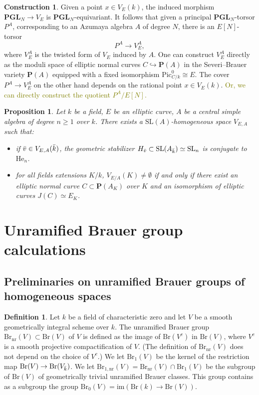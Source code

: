 \documentclass[10pt,letterpaper,twoside]{article}
\newcommand{\BA}[1]{\textcolor{olive}{#1}}
\renewcommand{\1}{\mathbf{1}}
\newcommand{\bP}{\mathbf{P}}
\newcommand{\nr}{\mathrm{nr}}
\newcommand{\im}{\mathrm{im}}
\renewcommand{\geq}{\geqslant}
\newcommand{\PGL}{\mathbf{PGL}}
\newcommand{\Pic}{\mathrm{Pic}}
\newcommand{\Br}{\mathrm{Br}}
\newcommand{\iso}{\cong}
\theoremstyle{plain}
\newtheorem{proposition}[theorem]{Proposition}
\theoremstyle{plain}
\theoremstyle{definition}
\theoremstyle{named}
\theoremstyle{definition}
\newtheorem{definition}[theorem]{Definition}
\newtheorem{construction}[theorem]{Construction}
\begin{document}
	\begin{construction}
		Given a point $x\in V_E(k)$, the induced morphism $\PGL_N\rightarrow V_E$ is
		$\PGL_N$-equivariant. It follows that given a principal $\PGL_N$-torsor $P^A$, corresponding to
		an Azumaya algebra $A$ of degree $N$, there is an $E[N]$-torsor $$P^A\rightarrow V_E^A,$$
		where $V_E^A$ is the twisted form of $V_E$ induced by $A$. One can construct $V_E^A$ directly as
		the moduli space of elliptic normal curves $C\hookrightarrow\bP(A)$ in the Severi--Brauer
		variety $\bP(A)$ equipped with a fixed isomorphism $\Pic^0_{C/k}\iso E$.
		The cover $P^A\rightarrow V_E^A$ on the other hand depends on the rational point $x\in V_E(k)$.
		\BA{Or, we can directly construct the quotient $P^A/E[N]$.}
	\end{construction}
	
	
	\begin{proposition}
		Let $k$ be a field, $E$ be an elliptic curve, $A$ be a central simple algebra of degree $n\geq 1$ over $k$. There exists a $\mathrm{SL}(A)$-homogeneous space $V_{E,A}$ such that:
		\begin{itemize}
			\item if $\Bar{v}\in V_{E,A}(\Bar{k})$, the geometric stabilizer $H_{\Bar{v}}\subset \mathrm{SL}(A_{\Bar{k}})\simeq \mathrm{SL}_n$ is conjugate to $\mathrm{He}_n$. 
			\item for all fields extensions $K/k$, $V_{E/A}(K)\neq\emptyset$ if and only if there exist an elliptic normal curve $C\subset \bP(A_K)$ over $K$ and an isomorphism of elliptic curves $J(C)\simeq E_K$.
		\end{itemize}
	\end{proposition}
	
	
	
	
	\section{Unramified Brauer group calculations}
	
	\subsection{Preliminaries on unramified Brauer groups of homogeneous spaces}
	
	\begin{definition}
		Let $k$ be a field of characteristic zero and let $V$ be a smooth geometrically integral scheme over $k$. The unramified Brauer group $\Br_{\nr}(V)\subset \Br(V)$ of $V$ is defined as the image of $\Br(V^c)$ in $\Br(V)$, where $V^c$ is a smooth projective compactification of $V$. (The definition of $\Br_{\nr}(V)$ does not depend on the choice of $V^c$.) We
		let $\Br_1(V)$ be the kernel of the restriction map $\Br(V)\to \Br(V_{\Bar{k}})$. We let $\Br_{1,\nr}(V)=\Br_\nr(V)\cap\Br_1(V)$ be the subgroup of $\Br(V)$ of geometrically trivial unramified Brauer classes. This group contains as a
		subgroup the group $\Br_0(V)=\im(\Br(k)\rightarrow\Br(V))$.
	\end{definition}
	
\end{document}
